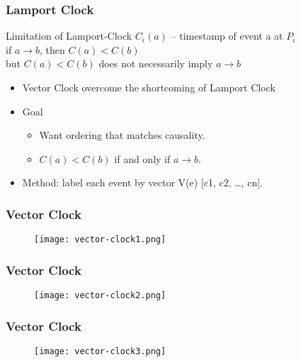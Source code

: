 \begin{frame}
    \frametitle{Lamport Clock}
    \begin{block}{Limitation of Lamport-Clock}
        $C_i(a)$ -- timestamp of event a at $P_i$ \\
        if $a \to b$, then $C(a) < C(b)$ \\
        but $C(a) < C(b)$ does not necessarily imply $a \to b$
    \end{block}
    \begin{itemize}
        \item Vector Clock overcome the shortcoming of Lamport Clock
        \item Goal
            \begin{itemize}
                \item Want ordering that matches causality.
                \item $C(a) < C(b)$ if and only if $a \to b$.
            \end{itemize}
        \item Method: label each event by vector V(e) [c1, c2, \ldots, cn].
    \end{itemize}
\end{frame}

\begin{frame}
    \frametitle{Vector Clock}
    \begin{figure}
        \centering
        \texttt{[image: vector-clock1.png]}
    \end{figure}
\end{frame}

\begin{frame}
    \frametitle{Vector Clock}
    \begin{figure}
        \centering
        \texttt{[image: vector-clock2.png]}
    \end{figure}
\end{frame}

\begin{frame}
    \frametitle{Vector Clock}
    \begin{figure}
        \centering
        \texttt{[image: vector-clock3.png]}
    \end{figure}
\end{frame}

